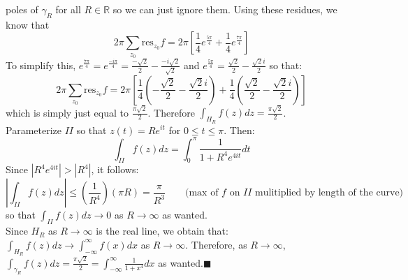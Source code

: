 \documentclass{article}
\begin{document}
    poles of $\gamma_R$ for all $R\in\mathbb{R}$ so we can just ignore them. Using these residues, we know that
    \[ 2\pi \sum_{z_0}\text{res}_{z_0} f = 2\pi[\frac{1}{4}e^{\frac{5\pi}{4}} + \frac{1}{4}e^{\frac{7\pi}{4}}] \]
    To simplify this, $e^{\frac{7\pi}{4}} = e^{\frac{-i\pi}{4}} = \frac{-\sqrt{2}}{2} - \frac{-i\sqrt{2}}{\sqrt{2}}$ and
    $e^{\frac{5\pi}{4}} = \frac{\sqrt{2}}{2} - \frac{\sqrt{2}i}{2}$ so that:
    \[ 2\pi \sum_{z_0}\text{res}_{z_0} f = 2\pi[\frac{1}{4}(-\frac{\sqrt{2}}{2} - \frac{\sqrt{2}i}{2})+\frac{1}{4}(
        \frac{\sqrt{2}}{2}-\frac{\sqrt{2}i}{2})] \]
    which is simply just equal to $\frac{\pi\sqrt{2}}{2}$. Therefore $\int_{H_R}f(z)dz = \frac{\pi\sqrt{2}}{2}$.\\
    Parameterize $II$ so that $z(t) = Re^{it}$ for $0\leq t\leq \pi$. Then:
    \[ \int_{II} f(z)dz = \int_0^{\pi} \frac{1}{1+R^4e^{4it}}dt \]
    Since $|R^4e^{4it}| > |R^4|$, it follows:
    \[ |\int_{II}f(z)dz| \leq (\frac{1}{R^4})(\pi R) = \frac{\pi}{R^3}  
        \qquad \text{(max of $f$ on $II$ mulitiplied by length of the curve)} \]
    so that $\int_{II}f(z)dz \to 0$ as $R\to\infty$ as wanted.\\
    Since $H_R$ as $R\to\infty$ is the real line, we obtain that: $\int_{H_R} f(z)dz \to \int_{-\infty}^{\infty}f(x)dx$ as $R\to\infty$.
    Therefore, as $R\to\infty$, $\int_{\gamma_R} f(z)dz = \frac{\pi\sqrt{2}}{2} = \int_{-\infty}^{\infty} \frac{1}{1+x^4}dx$ as 
    wanted.\hfill$\blacksquare$
\end{document}
